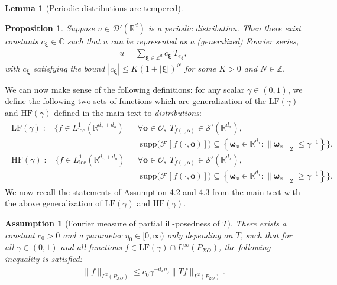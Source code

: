 \documentclass[11pt]{article}
\newcommand{\bo}{\mathbf o}
\newcommand{\bomega}{\boldsymbol{\omega}}
\newcommand{\calF}{\mathcal{F}}
\newcommand{\0}{\mathbf{0}}
\newtheorem{lem}{Lemma}[section]
\newtheorem{prop}{Proposition}[section]
\newtheorem{ass}{Assumption}[section]
\begin{document}
\begin{appendix}
\begin{lem}[Periodic distributions are tempered]
\end{lem}
\begin{prop}
    Suppose $u\in \mathcal{D}'(\mathbb{R}^{d})$ is a periodic distribution. Then there exist constants $c_{\boldsymbol{\xi}}\in \mathbb{C}$ such that $u$ can be represented as a (generalized) Fourier series, 
    \begin{align*}
        u = \sum_{\boldsymbol{\xi}\in \mathbb{Z}^d}c_{\boldsymbol{\xi}} \,T_{e_{\boldsymbol{\xi}}},
    \end{align*}
    with $c_{\boldsymbol{\xi}}$ satisfying the bound $|c_{\boldsymbol{\xi}}|\leq K(1+|\boldsymbol{\xi}|)^N$ for some $K>0$ and $N\in \mathbb{Z}$.
\end{prop}
We can now make sense of the following definitions: for any scalar $\gamma\in (0,1)$, we define the following two sets of functions which are generalization of the $\mathrm{LF}(\gamma)$ and $\mathrm{HF}(\gamma)$ defined in the main text to \emph{distributions}:
\begin{align} 
\label{eq:distribution_lf_hf_set_defn}
\begin{aligned}
\mathrm{LF}(\gamma) := \{ f\in L^1_{\mathrm{loc}}(\mathbb{R}^{d_x+d_o}) \ | \
& \forall \bo \in \mathcal{O}, \; T_{f(\cdot, \bo)} \in \mathcal
{S}'(\mathbb{R}^{d_x}), \\
& \;\mathrm{supp}\big(\calF[f(\cdot, \bo)]\big) 
\subseteq \left\{ \bomega_x \in \mathbb{R}^{d_x} : \|\bomega_x\|_2 \leq \gamma^{-1} \right\}
\}.\\
\mathrm{HF}(\gamma) := \{ f\in L^1_{\mathrm{loc}}(\mathbb{R}^{d_x+d_o}) \ | \
& \forall \bo \in \mathcal{O}, \; T_{f(\cdot, \bo)} \in \mathcal{S}'(\mathbb{R}^{d_x}), \\
& \;\mathrm{supp}\big(\calF[f(\cdot, \bo)]\big) 
\subseteq \left\{ \bomega_x \in \mathbb{R}^{d_x} : \|\bomega_x\|_2 \geq \gamma^{-1} \right\}
\}.
\end{aligned}
\end{align}
We now recall the statements of Assumption 4.2 and 4.3 from the main text with the above generalization of $\mathrm{LF}(\gamma)$ and $\mathrm{HF}(\gamma)$.
\begin{ass}[Fourier measure of partial ill-posedness of $T$]
\label{ass:T_frequency_ill_posedness_schwartz}
There exists a constant $c_0>0$ and a parameter $\eta_0\in [0,\infty)$ only depending on $T$, such that for all $\gamma \in (0,1)$ and all functions $f \in \mathrm{LF}(\gamma) \cap L^\infty(P_{XO})$, the following inequality is satisfied:
    \begin{align*}
        \|f\|_{L^2(P_{XO})} \leq c_0\gamma^{-d_x\eta_0} \|Tf\|_{L^2(P_{ZO})} .

\end{align*}
\end{ass}
\end{appendix}
\end{document}
